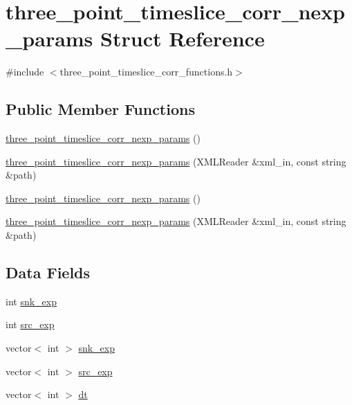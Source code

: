 \hypertarget{structthree__point__timeslice__corr__nexp__params}{}\section{three\+\_\+point\+\_\+timeslice\+\_\+corr\+\_\+nexp\+\_\+params Struct Reference}
\label{structthree__point__timeslice__corr__nexp__params}


{\ttfamily \#include $<$three\+\_\+point\+\_\+timeslice\+\_\+corr\+\_\+functions.\+h$>$}

\subsection*{Public Member Functions}
\begin{DoxyCompactItemize}
\item 
\mbox{\hyperlink{structthree__point__timeslice__corr__nexp__params_a19a58bcdda91d3186fb41dd0688adbda}{three\+\_\+point\+\_\+timeslice\+\_\+corr\+\_\+nexp\+\_\+params}} ()
\item 
\mbox{\hyperlink{structthree__point__timeslice__corr__nexp__params_a60a1b74e88356862cbe15fee7305006a}{three\+\_\+point\+\_\+timeslice\+\_\+corr\+\_\+nexp\+\_\+params}} (X\+M\+L\+Reader \&xml\+\_\+in, const string \&path)
\item 
\mbox{\hyperlink{structthree__point__timeslice__corr__nexp__params_a19a58bcdda91d3186fb41dd0688adbda}{three\+\_\+point\+\_\+timeslice\+\_\+corr\+\_\+nexp\+\_\+params}} ()
\item 
\mbox{\hyperlink{structthree__point__timeslice__corr__nexp__params_a60a1b74e88356862cbe15fee7305006a}{three\+\_\+point\+\_\+timeslice\+\_\+corr\+\_\+nexp\+\_\+params}} (X\+M\+L\+Reader \&xml\+\_\+in, const string \&path)
\end{DoxyCompactItemize}
\subsection*{Data Fields}
\begin{DoxyCompactItemize}
\item 
int \mbox{\hyperlink{structthree__point__timeslice__corr__nexp__params_a8eebcf20f87cc0a6abd104cb685340c7}{snk\+\_\+exp}}
\item 
int \mbox{\hyperlink{structthree__point__timeslice__corr__nexp__params_a7a0ed4d58b6858eb73fc1eff657b5447}{src\+\_\+exp}}
\item 
vector$<$ int $>$ \mbox{\hyperlink{structthree__point__timeslice__corr__nexp__params_aa073ad1b03ab79e0044a61faf5ad3451}{snk\+\_\+exp}}
\item 
vector$<$ int $>$ \mbox{\hyperlink{structthree__point__timeslice__corr__nexp__params_af165131a120b9dafdb2581b4fa5d73fb}{src\+\_\+exp}}
\item 
vector$<$ int $>$ \mbox{\hyperlink{structthree__point__timeslice__corr__nexp__params_a2c4b776d10c7a2b4eeb4569ea2b5fa6f}{dt}}
\end{DoxyCompactItemize}


